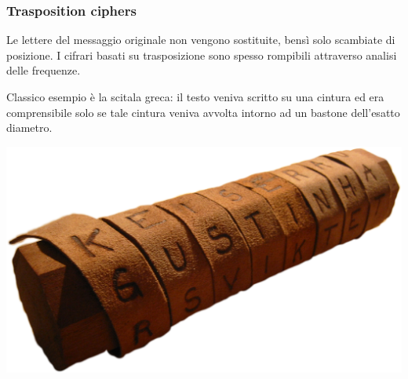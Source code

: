 \documentclass[a4paper, 11pt, twoside, openright, fleqn]{report}
\begin{document}
\subsubsection{Trasposition ciphers}
Le lettere del messaggio originale non vengono sostituite, bensì solo scambiate di posizione. I cifrari basati su trasposizione sono spesso rompibili attraverso analisi delle frequenze.\\[0.5em]
\begin{minipage}{.7\textwidth}
	Classico esempio è la scitala greca: il testo veniva scritto su una cintura ed era comprensibile solo se tale cintura veniva avvolta intorno ad un bastone dell'esatto diametro.
\end{minipage}
\begin{minipage}{.3\textwidth}
	\centering
	\includegraphics[width=.8\textwidth]{images/Scytale}
\end{minipage}
\end{document}
